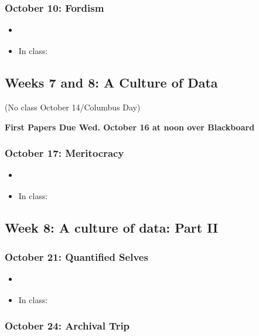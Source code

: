 \subsubsection{October 10: Fordism}

\begin{itemize}
\item
  \cite[Chapters 5 and 6]{meyer_five_1981}
\item
  In class: \cite[First fifteen minutes]{chaplin_modern_1936}
\end{itemize}

\subsection{Weeks 7 and 8: A Culture of Data}

(No class October 14/Columbus Day)

\textbf{First Papers Due Wed. October 16 at noon over Blackboard}

\subsubsection{October 17: Meritocracy}

\begin{itemize}
\item
  \cite[pp. 1-173]{lemann_big_1999}
\item
  In class: \cite[Book III, 412b-415c]{plato_republic_1968}
\end{itemize}

\subsection{Week 8: A culture of data: Part II}

\subsubsection{October 21: Quantified Selves}

\begin{itemize}
\item
  \cite[Introduction, Chapters 5 and 6, and Epilogue]{igo_averaged_2007}
\item
  In class: \cite[157-159]{foucault_history_1978}
\end{itemize}

\subsubsection{October 24: Archival Trip}

